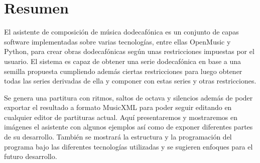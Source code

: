 \documentclass[a4paper,openany,oneside,12pt]{book}
\begin{document}
\chapter*{Resumen}

El asistente de composición de música dodecafónica es un conjunto de capas software implementadas sobre varias tecnologías, entre ellas OpenMusic y Python, para crear obras dodecafónicas según unas restricciones impuestas por el usuario. El sistema es capaz de obtener una serie dodecafónica en base a una semilla propuesta cumpliendo además ciertas restricciones para luego obtener todas las series derivadas de ella y componer con estas series y otras restricciones.

Se genera una partitura con ritmos, saltos de octava y silencios además de poder exportar el resultado a formato MusicXML para poder seguir editando en cualquier editor de partituras actual. Aquí presentaremos y mostraremos en imágenes el asistente con algunos ejemplos así como de exponer diferentes partes de su desarrollo. También se mostrará la estructura y la programación del programa bajo las diferentes tecnologías utilizadas y se sugieren enfoques para el futuro desarrollo.
\end{document}
